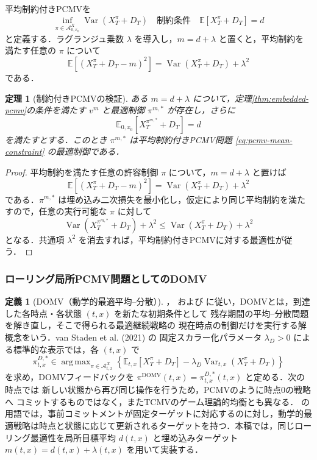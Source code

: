 \documentclass[10pt,a4paper]{article}
\theoremstyle{plain}
\newtheorem{theorem}{定理}
\theoremstyle{definition}
\newtheorem{definition}{定義}
\newcommand{\E}{\mathbb{E}}
\DeclareMathOperator{\Var}{Var}
\DeclareMathOperator*{\argmax}{arg\,max}
\newcommand{\A}{\mathcal{A}}
\begin{document}
平均制約付きPCMVを
\begin{equation}
  \inf_{\pi\in\A^X_{0,x_0}}\Var(X_T^\pi+D_T)
  \quad\text{制約条件}\quad
  \E[X_T^\pi+D_T]=d
  \label{eq:pcmv-mean-constraint}
\end{equation}
と定義する．ラグランジュ乗数 $\lambda$ を導入し，$m=d+\lambda$ と置くと，平均制約を満たす任意の $\pi$ について
\[
  \E[(X_T^\pi+D_T-m)^2]
  =\Var(X_T^\pi+D_T)+\lambda^2
\]
である．

\begin{theorem}[制約付きPCMVの検証]
\label{thm:pcmv}
ある $m=d+\lambda$ について，定理\ref{thm:embedded-pcmv}の条件を満たす $v^m$ と最適制御 $\pi^{m,*}$ が存在し，さらに
\[
  \E_{0,x_0}[X_T^{\pi^{m,*}}+D_T]=d
\]
を満たすとする．このとき $\pi^{m,*}$ は平均制約付きPCMV問題 \eqref{eq:pcmv-mean-constraint} の最適制御である．
\end{theorem}

\begin{proof}
平均制約を満たす任意の許容制御 $\pi$ について，$m=d+\lambda$ と置けば
\[
 \E[(X_T^\pi+D_T-m)^2]
 =\Var(X_T^\pi+D_T)+\lambda^2
\]
である．$\pi^{m,*}$ は埋め込み二次損失を最小化し，仮定により同じ平均制約を満たすので，任意の実行可能な $\pi$ に対して
\[
 \Var(X_T^{\pi^{m,*}}+D_T)+\lambda^2
 \leq \Var(X_T^\pi+D_T)+\lambda^2
\]
となる．共通項 $\lambda^2$ を消去すれば，平均制約付きPCMVに対する最適性が従う．
\end{proof}

\subsubsection{ローリング局所PCMV問題としてのDOMV}

\begin{definition}[DOMV（動学的最適平均--分散）]
\label{def:domv}
\citet{PedersenPeskir2017}，\citet{MenoncinVigna2020} および \citet{vanStadenDangForsyth2021}
に従い，DOMVとは，到達した各時点・各状態 $(t,x)$ を新たな初期条件として
残存期間の平均--分散問題を解き直し，そこで得られる最適継続戦略の
現在時点の制御だけを実行する解概念をいう．van Staden et al. (2021) の
固定スカラー化パラメータ $\lambda_D>0$ による標準的な表示では，各 $(t,x)$ で
\[
  \pi^{D,*}_{t,x}\in
  \argmax_{\pi\in\A^X_{t,x}}
  \left\{
    \E_{t,x}[X_T^\pi+D_T]
    -\lambda_D\Var_{t,x}(X_T^\pi+D_T)
  \right\}
\]
を求め，DOMVフィードバックを
$\pi^{\mathrm{DOMV}}(t,x)=\pi^{D,*}_{t,x}(t,x)$ と定める．次の時点では
新しい状態から再び同じ操作を行うため，PCMVのように時点0の戦略へ
コミットするものではなく，またTCMVのゲーム理論的均衡とも異なる．
\citet{MenoncinVigna2020} の用語では，事前コミットメントが固定ターゲットに対応するのに対し，動学的最適戦略は時点と状態に応じて更新されるターゲットを持つ．本稿では，同じローリング最適性を局所目標平均 $d(t,x)$ と埋め込みターゲット
$m(t,x)=d(t,x)+\lambda(t,x)$ を用いて実装する．
\end{definition}
\end{document}
